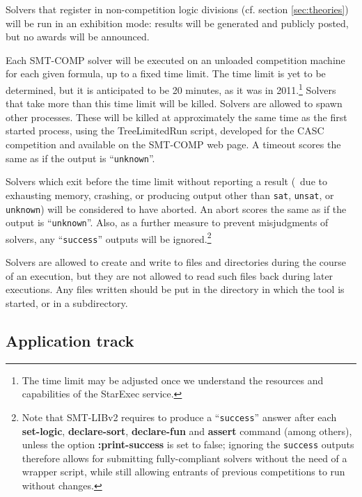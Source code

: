 \documentclass[12pt]{article}
\newcommand{\akey}[1]{\textbf{#1}}
\begin{document}
Solvers that register in non-competition logic divisions (cf. section \ref{sec:theories})
will be run in an exhibition mode: results will be generated and publicly
posted, but no awards will be announced.

Each SMT-COMP solver will be executed on an
unloaded competition machine for each given formula, up to a fixed
time limit.  The time limit is yet to be determined, but it is
anticipated to be 20 minutes, as it was in 2011.\footnote{The time limit may be adjusted once we understand the resources and capabilities of the StarExec service.} 
Solvers that take more than this
time limit will be killed.  Solvers are allowed to spawn other
processes.  These will be killed at approximately the same time as the
first started process, using the TreeLimitedRun script, developed for
the CASC competition and available on the SMT-COMP web page.  A
timeout scores the same as if the output is ``\texttt{unknown}''.

Solvers which exit before the time
limit without reporting a result (\ie\ due to exhausting memory, crashing,
or producing output other than \texttt{sat}, \texttt{unsat}, or
\texttt{unknown})
will be considered to have aborted. 
An abort scores the same as if the output is ``\texttt{unknown}''. 
Also, as a further measure to prevent misjudgments of solvers,
any  ``\texttt{success}'' outputs will be 
ignored.\footnote{
Note that SMT-LIBv2 requires to produce a ``\texttt{success}'' answer
after each \akey{set-logic}, \akey{declare-sort}, \akey{declare-fun} and
\akey{assert} command (among others), unless the option
\akey{:print-success} is set to false; ignoring the
\texttt{success} outputs therefore allows for submitting fully-compliant
solvers without the need of a wrapper script, while still allowing entrants
of previous competitions to run without changes.}

Solvers are allowed to create and write to
files and directories during the course of an execution, but they are
not allowed to read such files back during later executions.  Any
files written should be put in the directory in which the tool is
started, or in a subdirectory.

\subsection{Application track}
\label{sec:exec:application}
\end{document}
